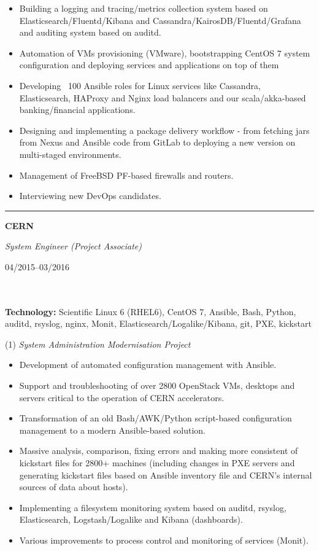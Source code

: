 \documentclass[$fontsize$, a4paper]{article}
\newcommand\textbox[1]{%
  \parbox{.333\textwidth}{#1}%
}
\begin{document}
\vspace{5pt}
\begin{itemize}
  \item Building a logging and tracing/metrics collection system based on Elasticsearch/Fluentd/Kibana and Cassandra/KairosDB/Fluentd/Grafana and auditing system based on auditd.
  \item Automation of VMs provisioning (VMware), bootstrapping CentOS 7 system configuration and deploying services and applications on top of them
  \item Developing ~100 Ansible roles for Linux services like Cassandra, Elasticsearch, HAProxy and Nginx load balancers and our scala/akka-based banking/financial applications.
  \item Designing and implementing a package delivery workflow - from fetching jars from Nexus and Ansible code from GitLab to deploying a new version on multi-staged environments.
  \item Management of FreeBSD PF-based firewalls and routers.
  \item Interviewing new DevOps candidates.
\end{itemize}


\noindent\rule[0.5ex]{\linewidth}{1pt}

\noindent\textbox{\textbf{\textsc{CERN}}\hfill}\textbox{\hfil \emph{System Engineer (Project Associate)}\hfil}\textbox{\hfill 04/2015--03/2016}\\\\
\textbf{Technology:} Scientific Linux 6 (RHEL6), CentOS 7, Ansible, Bash, Python, auditd, rsyslog, nginx, Monit, Elasticsearch/Logalike/Kibana, git, PXE, kickstart

\vspace{5pt}
(1) \emph{System Administration Modernisation Project}
\begin{itemize}
  \item Development of automated configuration management with Ansible.
  \item Support and troubleshooting of over 2800 OpenStack VMs, desktops and servers critical to the operation of CERN accelerators.
  \item Transformation of an old Bash/AWK/Python script-based configuration management to a modern Ansible-based solution.
  \item Massive analysis, comparison, fixing errors and making more consistent of kickstart files for 2800+ machines (including changes in PXE servers and generating kickstart files based on Ansible inventory file and CERN's internal sources of data about hosts).
  \item Implementing a filesystem monitoring system based on auditd, rsyslog, Elasticsearch, Logstash/Logalike and Kibana (dashboards).
  \item Various improvements to process control and monitoring of services (Monit).
\end{itemize}
\end{document}
